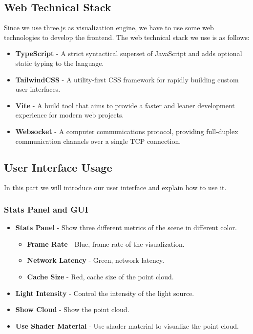 \documentclass[11pt, a4paper,oneside,chapterprefix=false]{scrbook}
\begin{document}
\subsection{Web Technical Stack}

Since we use three.js as visualization engine, we have to use some web technologies to develop the frontend. The web technical stack we use is as follows: 

\begin{itemize}
	\item \textbf{TypeScript} - A strict syntactical superset of JavaScript and adds optional static typing to the language.
	\item \textbf{TailwindCSS} - A utility-first CSS framework for rapidly building custom user interfaces.
	\item \textbf{Vite} - A build tool that aims to provide a faster and leaner development experience for modern web projects.
	\item \textbf{Websocket} - A computer communications protocol, providing full-duplex communication channels over a single TCP connection.
\end{itemize}

\subsection{User Interface Usage}

In this part we will introduce our user interface and explain how to use it.

\subsubsection{Stats Panel and GUI}

\begin{itemize}
	\item \textbf{Stats Panel} - Show three different metrics of the scene in different color.
		\begin{itemize}
			\item \textbf{Frame Rate} - Blue, frame rate of the visualization.
			\item \textbf{Network Latency} - Green, network latency.
			\item \textbf{Cache Size} - Red, cache size of the point cloud.
		\end{itemize}
	\item \textbf{Light Intensity} - Control the intensity of the light source.
	\item \textbf{Show Cloud} - Show the point cloud.
	\item \textbf{Use Shader Material} - Use shader material to visualize the point cloud.
\end {itemize}	
\end{document}
